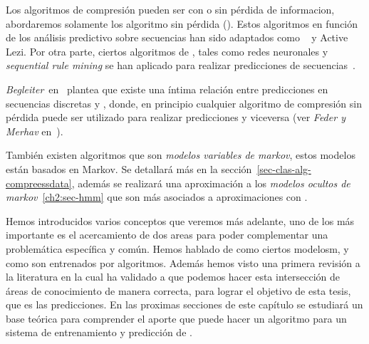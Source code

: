 Los algoritmos de compresión pueden ser con o sin pérdida de informacion, abordaremos solamente los algoritmo sin pérdida (\losslessdatacompression). Estos algoritmos en función de los análisis predictivo sobre secuencias han sido adaptados como \lzSieteOcho~\cite{ZivLempel1978} y Active Lezi\cite{Gopalratnam2007}. Por otra parte, ciertos algoritmos de \machinelearning, tales como redes neuronales y \emph{sequential rule mining} se han aplicado para realizar predicciones de secuencias~\cite{Gueniche2015}.

\emph{Begleiter}~\etal en~\cite{Begleiter2004} plantea que existe una  íntima relación entre predicciones  en secuencias discretas y \losslessdatacompression, donde, en principio cualquier algoritmo de compresión sin pérdida puede ser utilizado para realizar predicciones y viceversa (ver \emph{Feder y Merhav} en~\cite{Feder1992}).

También existen algoritmos que son \emph{modelos variables de markov}, estos modelos están basados en Markov. Se detallará más en la sección~\ref{sec-clas-alg-compreessdata}, además se realizará una aproximación a los \emph{modelos ocultos de markov}~\ref{ch2:sec-hmm} que son más asociados a aproximaciones con \machinelearning.




\uncm
Hemos introducidos varios conceptos que veremos más adelante, uno de los más importante es el acercamiento de dos areas para poder complementar una problemática específica y común. Hemos hablado de como ciertos modelosm, y como son entrenados por algoritmos. Además hemos visto una primera revisión a la literatura en la cual ha validado a que podemos hacer esta intersección de áreas de conocimiento de manera correcta, para lograr el objetivo de esta tesis, que es las predicciones. En las proximas secciones de este capítulo se estudiará un base teórica para comprender el aporte que puede hacer un algoritmo \losslessdatacompression para un sistema de entrenamiento y predicción de \machinelearning.








